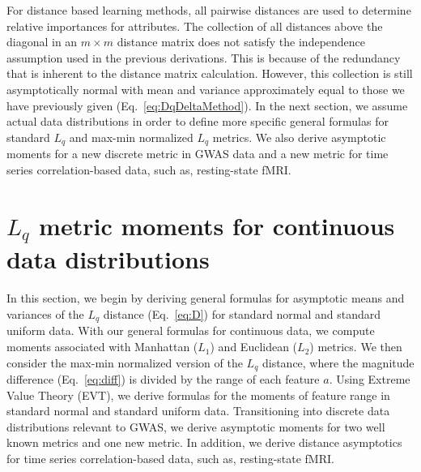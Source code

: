 \documentclass[aoas]{imsart}
\begin{document}
For distance based learning methods, all pairwise distances are used to determine relative importances for attributes. The collection of all distances above the diagonal in an $m \times m$ distance matrix does not satisfy the independence assumption used in the previous derivations. This is because of the redundancy that is inherent to the distance matrix calculation. However, this collection is still asymptotically normal with mean and variance approximately equal to those we have previously given (Eq.~\ref{eq:DqDeltaMethod}). In the next section, we assume actual data distributions in order to define more specific general formulas for standard $L_q$ and max-min normalized $L_q$ metrics. We also derive asymptotic moments for a new discrete metric in GWAS data and a new metric for time series correlation-based data, such as, resting-state fMRI.


\section{\texorpdfstring{$L_q$}{} metric moments for continuous data distributions}\label{sec:moment_derivations}

In this section, we begin by deriving general formulas for asymptotic means and variances of the $L_q$ distance (Eq.~\ref{eq:D}) for standard normal and standard uniform data. With our general formulas for continuous data, we compute moments associated with Manhattan ($L_1$) and Euclidean ($L_2$) metrics. We then consider the max-min normalized version of the $L_q$ distance, where the magnitude difference (Eq.~\ref{eq:diff}) is divided by the range of each feature $a$. Using Extreme Value Theory (EVT), we derive formulas for the moments of feature range in standard normal and standard uniform data. Transitioning into discrete data distributions relevant to GWAS, we derive asymptotic moments for two well known metrics and one new metric. In addition, we derive distance asymptotics for time series correlation-based data, such as, resting-state fMRI. 
\end{document}
